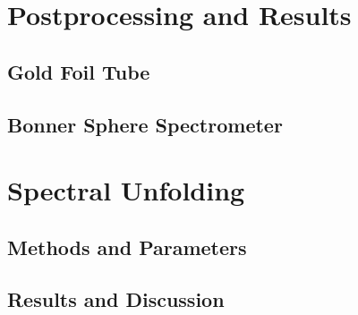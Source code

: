 \section{Postprocessing and Results}
\subsection{Gold Foil Tube}
\subsection{Bonner Sphere Spectrometer}

\section{Spectral Unfolding}
\subsection{Methods and Parameters}
\subsection{Results and Discussion}


